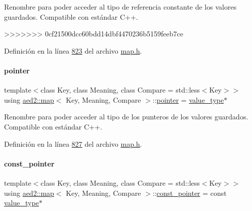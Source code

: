 Renombre para poder acceder al tipo de referencia constante de los valores guardados. Compatible con estándar C++. 

>>>>>>> 0cf21500dcc60bdd14dbf4470236b5159feeb7ce


Definición en la línea \hyperlink{map_8h_source_l00823}{823} del archivo \hyperlink{map_8h_source}{map.\+h}.

\mbox{\label{classaed2_1_1map_a7394e98a23b86bc008ad73326b273fd5_a7394e98a23b86bc008ad73326b273fd5}} 
\paragraph{\texorpdfstring{pointer}{pointer}}
{\footnotesize\ttfamily template$<$class Key, class Meaning, class Compare = std\+::less$<$\+Key$>$$>$ \\
using \hyperlink{classaed2_1_1map}{aed2\+::map}$<$ Key, Meaning, Compare $>$\+::\hyperlink{classaed2_1_1map_a7394e98a23b86bc008ad73326b273fd5_a7394e98a23b86bc008ad73326b273fd5}{pointer} =  \hyperlink{classaed2_1_1map_a719db98e0ff9a837610f76be33264680_a719db98e0ff9a837610f76be33264680}{value\+\_\+type}$\ast$}



Renombre para poder acceder al tipo de los punteros de los valores guardados. Compatible con estándar C++. 



Definición en la línea \hyperlink{map_8h_source_l00827}{827} del archivo \hyperlink{map_8h_source}{map.\+h}.

\mbox{\label{classaed2_1_1map_a1366fc3e227a49777cb748fc6d4e022b_a1366fc3e227a49777cb748fc6d4e022b}} 
\paragraph{\texorpdfstring{const\+\_\+pointer}{const\_pointer}}
{\footnotesize\ttfamily template$<$class Key, class Meaning, class Compare = std\+::less$<$\+Key$>$$>$ \\
using \hyperlink{classaed2_1_1map}{aed2\+::map}$<$ Key, Meaning, Compare $>$\+::\hyperlink{classaed2_1_1map_a1366fc3e227a49777cb748fc6d4e022b_a1366fc3e227a49777cb748fc6d4e022b}{const\+\_\+pointer} =  const \hyperlink{classaed2_1_1map_a719db98e0ff9a837610f76be33264680_a719db98e0ff9a837610f76be33264680}{value\+\_\+type}$\ast$}



